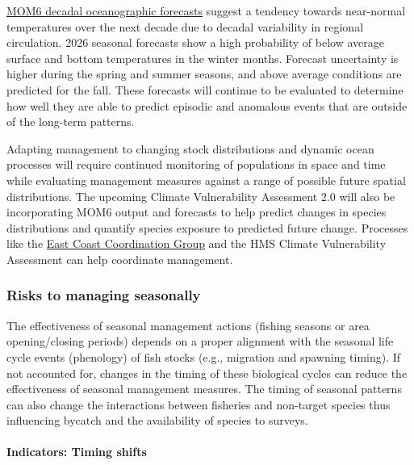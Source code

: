 \documentclass[
  10pt,
]{article}
\begin{document}
\href{https://noaa-edab.github.io/catalog/MOM6_forecasts.html}{MOM6 decadal oceanographic forecasts} suggest a tendency towards near-normal temperatures over the next decade due to decadal variability in regional circulation. 2026 seasonal forecasts show a high probability of below average surface and bottom temperatures in the winter months. Forecast uncertainty is higher during the spring and summer seasons, and above average conditions are predicted for the fall. These forecasts will continue to be evaluated to determine how well they are able to predict episodic and anomalous events that are outside of the long-term patterns.

Adapting management to changing stock distributions and dynamic ocean processes will require continued monitoring of populations in space and time while evaluating management measures against a range of possible future spatial distributions. The upcoming Climate Vulnerability Assessment 2.0 will also be incorporating MOM6 output and forecasts to help predict changes in species distributions and quantify species exposure to predicted future change. Processes like the \href{https://www.mafmc.org/e3cg}{East Coast Coordination Group} and the HMS Climate Vulnerability Assessment can help coordinate management.

\newpage

\subsubsection{Risks to managing seasonally}\label{risks-to-managing-seasonally}

The effectiveness of seasonal management actions (fishing seasons or area opening/closing periods) depends on a proper alignment with the seasonal life cycle events (phenology) of fish stocks (e.g., migration and spawning timing). If not accounted for, changes in the timing of these biological cycles can reduce the effectiveness of seasonal management measures. The timing of seasonal patterns can also change the interactions between fisheries and non-target species thus influencing bycatch and the availability of species to surveys.

\paragraph{Indicators: Timing shifts}\label{indicators-timing-shifts}
\end{document}
